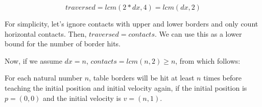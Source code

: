 \documentclass[12pt,a4paper,titlepage,oneside]{article}
\begin{document}
\begin{displaymath}
    \mathit{traversed} = lcm(2 * dx, 4) = lcm(dx, 2)
\end{displaymath}

For simplicity, let's ignore contacts with upper and lower borders and only count horizontal contacts.
Then, $\mathit{traversed} = \mathit{contacts}$. We can use this as a lower bound for the number of border hits.

Now, if we assume $dx = n$, $\mathit{contacts} = lcm(n, 2) \geq n$, from which follows:

For each natural number $n$, table borders will be hit at least $n$ times before teaching the initial position and initial velocity again, if
the initial position is $p = (0, 0)$ and the initial velocity is $v = (n, 1)$.







\newpage
\appendix
\end{document}
